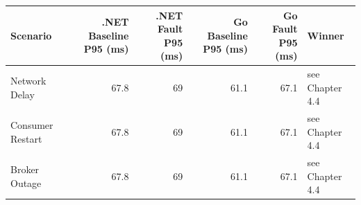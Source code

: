 \begin{tabular}{lrrrrl}
\toprule
 Scenario         &   .NET Baseline P95 (ms) &   .NET Fault P95 (ms) &   Go Baseline P95 (ms) &   Go Fault P95 (ms) & Winner          \\
\midrule
 Network Delay    &                     67.8 &                    69 &                   61.1 &                67.1 & see Chapter 4.4 \\
 Consumer Restart &                     67.8 &                    69 &                   61.1 &                67.1 & see Chapter 4.4 \\
 Broker Outage    &                     67.8 &                    69 &                   61.1 &                67.1 & see Chapter 4.4 \\
\bottomrule
\end{tabular}